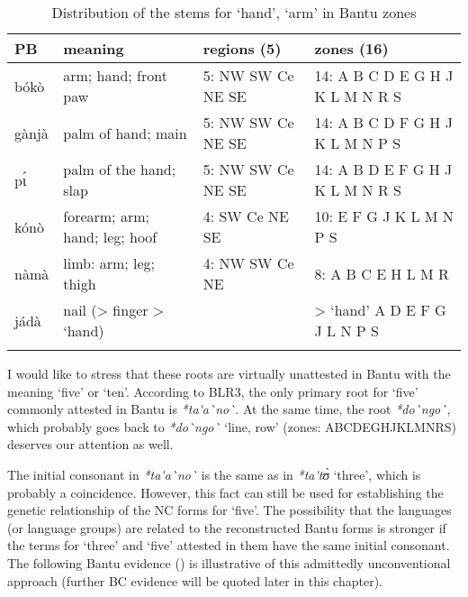 \begin{table}
\caption{\label{tab:4:17}Distribution of the stems for `hand', `arm' in Bantu zones}


\begin{tabularx}{\textwidth}{lQlQ}
\lsptoprule

PB & meaning & regions (5) & zones (16)\\
\midrule
bókò & arm; hand; front paw & 5: NW SW Ce NE SE & 14: A B C D E G H J K L M N R S\\
gànjà & palm of hand; main & 5: NW SW Ce NE SE & 14: A B C D F G H J K L M N P S\\
p{\'{ɩ}} & palm of the hand; slap & 5: NW SW Ce NE SE & 14: A B D E F G H J K L M N R S\\
kónò & forearm; arm; hand; leg; hoof & 4: SW Ce NE SE & 10: E F G J K L M N P S\\
nàmà & limb: arm; leg; thigh & 4: NW SW Ce NE & 8: A B C E H L M R\\
jádà & nail (> finger > `hand) &  & > `hand'   A D E F G J L N P S\\
\lspbottomrule
\end{tabularx}

\end{table}

I would like to stress that these roots are virtually unattested in Bantu with the meaning ‘five’ or ‘ten’. According to BLR3, the only primary root for ‘five’ commonly attested in Bantu is \textit{*ta\'{}a\`{}no\`{}}. At the same time, the root \textit{*do\`{}ngo\`{}}, which probably goes back to \textit{*do\`{}ngo\`{}} ‘line, row’ (zones: ABCDEGHJKLMNRS) deserves our attention as well.

The initial consonant in \textit{*ta\'{}a\`{}no\`{}} is the same as in \textit{*ta\'{}t{\`{ʊ}}} ‘three’, which is probably a coincidence. However, this fact can still be used for establishing the genetic relationship of the NC forms for ‘five’. The possibility that the languages (or language groups) are related to the reconstructed Bantu forms is stronger if the terms for ‘three’ and ‘five’ attested in them have the same initial consonant. The following Bantu evidence () is illustrative of this admittedly unconventional approach (further BC evidence will be quoted later in this chapter).


